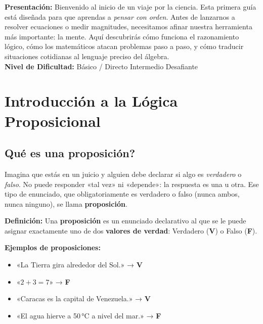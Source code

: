 \documentclass[12pt, a4paper]{article}
\begin{document}


\vspace{4pt}
\begin{cuadroinfo}
\small
\textbf{Presentación:} Bienvenido al inicio de un viaje por la ciencia. Esta primera guía está diseñada para que aprendas a \emph{pensar con orden}. Antes de lanzarnos a resolver ecuaciones o medir magnitudes, necesitamos afinar nuestra herramienta más importante: la mente. Aquí descubrirás cómo funciona el razonamiento lógico, cómo los matemáticos atacan problemas paso a paso, y cómo traducir situaciones cotidianas al lenguaje preciso del álgebra.
\\[4pt]
\textbf{Nivel de Dificultad:}\quad
\facil{} Básico / Directo \quad
\medio{} Intermedio \quad
\dificil{} Desafiante
\end{cuadroinfo}

\vspace{8pt}

\section{Introducción a la Lógica Proposicional}

\subsection{\textquestiondown Qué es una proposición?}

Imagina que estás en un juicio y alguien debe declarar si algo es \emph{verdadero} o \emph{falso}. No puede responder «tal vez» ni «depende»: la respuesta es una u otra. Ese tipo de enunciado, que obligatoriamente es verdadero o falso (nunca ambos, nunca ninguno), se llama \textbf{proposición}.

\begin{cuadroteoria}
\textbf{Definición:} Una \textbf{proposición} es un enunciado declarativo al que se le puede asignar exactamente uno de dos \textbf{valores de verdad}: Verdadero (\textbf{V}) o Falso (\textbf{F}).
\end{cuadroteoria}

\noindent\textbf{Ejemplos de proposiciones:}
\begin{itemize}[leftmargin=*]
  \item «La Tierra gira alrededor del Sol.» → \textbf{V}
  \item «$2 + 3 = 7$» → \textbf{F}
  \item «Caracas es la capital de Venezuela.» → \textbf{V}
  \item «El agua hierve a 50\,°C a nivel del mar.» → \textbf{F}
\end{itemize}
\end{document}
